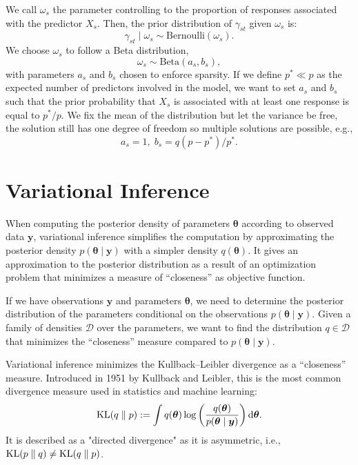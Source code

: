 \documentclass[a4paper, 11pt]{report}
\numberwithin{equation}{chapter}
\DeclareMathOperator*{\KL}{{\rm KL}}
\begin{document}
We call $\omega_s$ the parameter controlling to the proportion of responses associated with the predictor $X_s$. Then, the prior distribution of $\gamma_{st}$ given $\omega_s$ is:
\begin{equation*}
\gamma_{st} \mid \omega_s \sim  \text{Bernoulli}(\omega_s).
\end{equation*}
We choose $\omega_s$ to follow a Beta distribution,
\begin{equation*}
\omega_s \sim \text{Beta}(a_s, b_s),
\end{equation*}
with parameters $a_s$ and $b_s$ chosen to enforce sparsity. If we define $p^* \ll p$ as the expected number of predictors involved in the model, we want to set $a_s$ and $b_s$ such that the prior probability that $X_s$ is associated with at least one response is equal to $p^*/p$. We fix the mean of the distribution but let the variance be free, the solution still has one degree of freedom so multiple solutions are possible, e.g.,
\begin{equation*}
a_s = 1,\;b_s = q(p-p^*)/p^*.
\end{equation*}
\newpage
\chapter{Variational Inference}
When computing the posterior density of parameters $\boldsymbol{\theta}$ according to observed data $\boldsymbol{y}$, variational inference simplifies the computation by approximating the posterior density $p(\boldsymbol{\theta}\mid \boldsymbol{y})$ with a simpler density $q(\boldsymbol{\theta})$. It gives an approximation to the posterior distribution as a result of an optimization problem that minimizes a measure of ``closeness'' as objective function.

If we have observations $\boldsymbol{y}$ and parameters $\boldsymbol{\theta}$, we need to determine the posterior distribution of the parameters conditional on the observations $p(\boldsymbol{\theta} \mid \boldsymbol{y})$. Given a family of densities $\mathcal{D}$ over the parameters, we want to find the distribution $q \in \mathcal{D}$ that minimizes the ``closeness'' measure compared to $p(\boldsymbol{\theta} \mid \boldsymbol{y})$.

Variational inference minimizes the Kullback--Leibler divergence as a ``closeness'' measure. Introduced in 1951 by Kullback and Leibler\cite{kl51}, this is the most common divergence measure used in statistics and machine learning:
\begin{equation*}
\KL(q\parallel p) := \int q(\boldsymbol{\theta})\log \left(\frac{q(\boldsymbol{\theta})}{p(\boldsymbol{\theta} \mid \boldsymbol{y})}\right) \mathrm{d}\boldsymbol{\theta}.
\end{equation*} 
It is described as a "directed divergence" as it is asymmetric, i.e., $\KL(p\parallel q) \neq \KL(q \parallel p)$.
\end{document}
